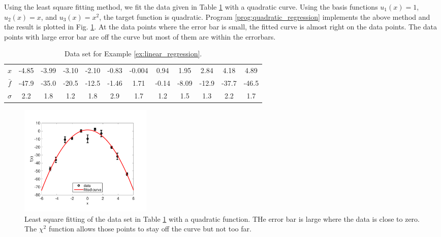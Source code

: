 \bigskip
\begin{example}\label{ex:quadratic_regression}

Using the least square fitting method, we fit the data given in Table \ref{tbl:quadratic_regression} with a quadratic curve.
Using the basis functions $u_1(x)=1$, $u_2(x)=x$, and $u_3(x)=x^2$, the target function is quadratic.   Program \ref{prog:quadratic_regression} implements the above method and the result is plotted in Fig. \ref{fig:quadratic_regression}.  At the data points where the error bar is small, the fitted curve is almost right on the data points.  The data points with large error bar are off the curve but most of them are within the errorbars. 

\begin{table}
\centering
\caption{Data set for Example \ref{ex:linear_regression}.}\label{tbl:quadratic_regression}
\begin{tabular}{c|ccccccccccc}
\hline
$x$ &-4.85&-3.99&-3.10&-2.10&-0.83&-0.004&0.94&1.95&2.84&4.18&4.89\\
$\bar{f}$&-47.9&-35.0&-20.5&-12.5&-1.46&1.71&-0.14&-8.09&-12.9&-37.7&-46.5\\
$\sigma$&2.2&1.8&1.2&1.8&2.9&1.7&1.2&1.5&1.3&2.2&1.7\\
\hline
\end{tabular}

\end{table}

\begin{figure}
\centering
\includegraphics[width=2.5in]{12.fitting/quadratic_regression.pdf}
\caption{Least square fitting of the data set in Table \ref{tbl:quadratic_regression} with a quadratic function.  THe error bar is large where the data is close to zero.  The $\chi^2$ function allows those points to stay off the curve but not too far.}\label{fig:quadratic_regression}
\end{figure}
\end{example}


\noindent
